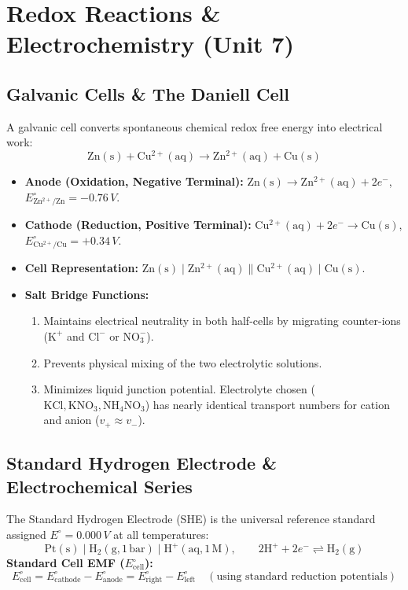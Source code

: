 \documentclass[10pt,a4paper]{article}
\begin{document}
\section{Redox Reactions \& Electrochemistry (Unit 7)}

\subsection{Galvanic Cells \& The Daniell Cell}
A galvanic cell converts spontaneous chemical redox free energy into electrical work:
\begin{equation}
  \mathrm{Zn(s)} + \mathrm{Cu^{2+}(aq)} \longrightarrow \mathrm{Zn^{2+}(aq)} + \mathrm{Cu(s)}
\end{equation}
\begin{itemize}
  \item \textbf{Anode (Oxidation, Negative Terminal):} $\mathrm{Zn(s)} \to \mathrm{Zn^{2+}(aq)} + 2e^-$, $E^\circ_{\mathrm{Zn^{2+}/Zn}} = -0.76\,\si{V}$.
  \item \textbf{Cathode (Reduction, Positive Terminal):} $\mathrm{Cu^{2+}(aq)} + 2e^- \to \mathrm{Cu(s)}$, $E^\circ_{\mathrm{Cu^{2+}/Cu}} = +0.34\,\si{V}$.
  \item \textbf{Cell Representation:} $\mathrm{Zn(s)} \mid \mathrm{Zn^{2+}(aq)} \parallel \mathrm{Cu^{2+}(aq)} \mid \mathrm{Cu(s)}$.
  \item \textbf{Salt Bridge Functions:}
  \begin{enumerate}
    \item Maintains electrical neutrality in both half-cells by migrating counter-ions ($\mathrm{K}^+$ and $\mathrm{Cl}^-$ or $\mathrm{NO_3^-}$).
    \item Prevents physical mixing of the two electrolytic solutions.
    \item Minimizes liquid junction potential. Electrolyte chosen ($\mathrm{KCl, KNO_3, NH_4NO_3}$) has nearly identical transport numbers for cation and anion ($v_+ \approx v_-$).
  \end{enumerate}
\end{itemize}

\subsection{Standard Hydrogen Electrode \& Electrochemical Series}
The Standard Hydrogen Electrode (SHE) is the universal reference standard assigned $E^\circ = 0.000\,\si{V}$ at all temperatures:
\begin{equation}
  \mathrm{Pt(s)} \mid \mathrm{H_2(g, 1\,bar)} \mid \mathrm{H^+(aq, 1\,M)}, \qquad 2\mathrm{H^+} + 2e^- \rightleftharpoons \mathrm{H_2(g)}
\end{equation}
\textbf{Standard Cell EMF ($E_{\text{cell}}^\circ$):}
\begin{equation}
  E_{\text{cell}}^\circ = E_{\text{cathode}}^\circ - E_{\text{anode}}^\circ = E_{\text{right}}^\circ - E_{\text{left}}^\circ \quad (\text{using standard reduction potentials})
\end{equation}
\end{document}
